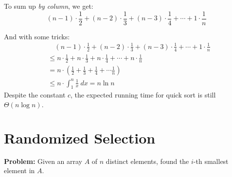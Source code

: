\begin{spacing}{1.3}
    To sum up {\it by column}, we get: 
    $$(n-1)\cdot \frac{1}{2}+(n-2)\cdot \frac{1}{3}+
    (n-3)\cdot \frac{1}{4}+\cdots +1\cdot \frac{1}{n}$$

    And with some tricks: 
    \begin{align*}
        &\quad (n-1)\cdot \frac{1}{2}+(n-2)\cdot \frac{1}{3}+
        (n-3)\cdot \frac{1}{4}+\cdots +1\cdot \frac{1}{n}\\
        &\le n\cdot \frac{1}{2}+n\cdot \frac{1}{3}+
        n\cdot \frac{1}{4}+\cdots +n\cdot \frac{1}{n}\\
        &= n\cdot \left(\frac{1}{2}+\frac{1}{3}+
        \frac{1}{4}+\cdots \frac{1}{n} \right)\\
        &\le n\cdot \int_1^{n} \frac{1}{x}\ dx= n\ln n
    \end{align*}
    Despite the constant $c$, the expected running time 
    for quick sort is still $\Theta(n\log n)$.

    \section{Randomized Selection}

    {\bf Problem: }Given an array $A$ of $n$ distinct 
    elements, found the $i$-th smallest element in $A$.


\end{spacing}
